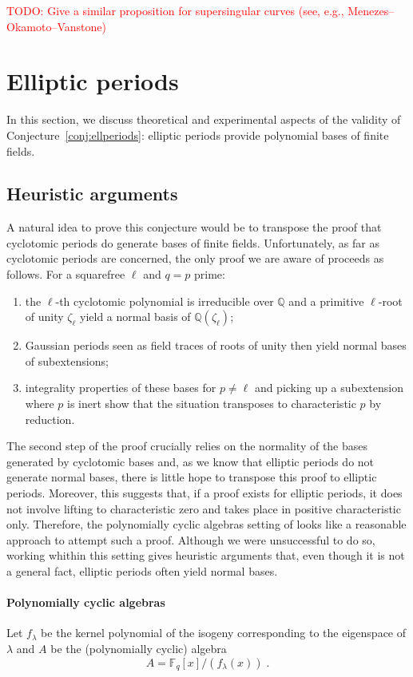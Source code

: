 \documentclass[12pt]{article}
\theoremstyle{plain}
\theoremstyle{definition}
\newcommand{\todo}[1]{\textcolor{red}{TODO: #1}}
\def\Q{\ensuremath{\mathbb{Q}}}
\def\F{\ensuremath{\mathbb{F}}}
\begin{document}
\todo{Give a similar proposition for supersingular curves (see, e.g.,
  Menezes--Okamoto--Vanstone)}

\section{Elliptic periods}
\label{app:ellprdsdata}

In this section, we discuss theoretical and experimental aspects
of the validity of Conjecture~\ref{conj:ellperiods}:
elliptic periods provide polynomial bases of finite fields.

\subsection{Heuristic arguments}

A natural idea to prove this conjecture would be to transpose
the proof that cyclotomic periods do generate bases of finite fields.
Unfortunately, as far as cyclotomic periods are concerned,
the only proof we are aware of proceeds as follows.
For a squarefree $\ell$ and $q = p$ prime:
\begin{enumerate}
\item the $\ell$-th cyclotomic polynomial is irreducible over $\Q$ and
a primitive $\ell$-root of unity $\zeta_\ell$ yield a normal basis
of $\Q(\zeta_\ell)$;
\item Gaussian periods seen as field traces of roots of unity
then yield normal bases of subextensions;
\item integrality properties of these bases for $p \neq \ell$
and picking up a subextension where $p$ is inert show that
the situation transposes to characteristic $p$ by reduction.
\end{enumerate}
The second step of the proof crucially relies on the normality
of the bases generated by cyclotomic bases and, as we know
that elliptic periods do not generate normal bases,
there is little hope to transpose this proof to elliptic periods.
Moreover, this suggests that, if a proof exists for elliptic periods,
it does not involve lifting to characteristic zero
and takes place in positive characteristic only.
Therefore, the polynomially cyclic algebras setting of \cite{Mihailescu2010825}
looks like a reasonable approach to attempt such a proof.
Although we were unsuccessful to do so, working whithin this setting gives
heuristic arguments that, even though it is not a general fact,
elliptic periods often yield normal bases.

\paragraph{Polynomially cyclic algebras}
Let $f_\lambda$ be the kernel polynomial of the isogeny corresponding
to the eigenspace of $\lambda$ and $A$ be the (polynomially cyclic)
algebra
\[
A = \F_q[x]/(f_\lambda(x)) \; .
\]
\end{document}

